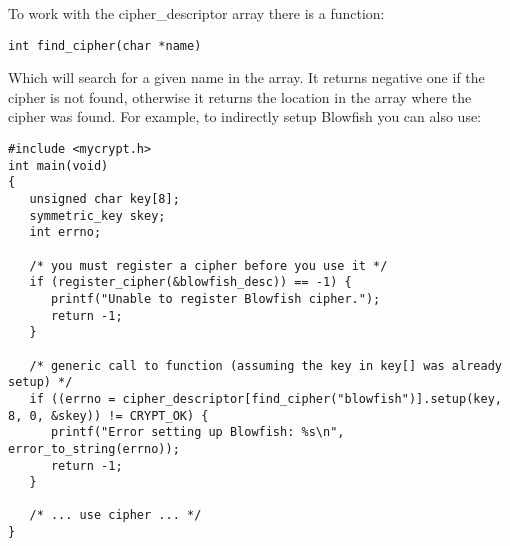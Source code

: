 \documentclass[b5paper]{book}
\begin{document}
To work with the cipher\_descriptor array there is a function:
\begin{verbatim}
int find_cipher(char *name)
\end{verbatim}
Which will search for a given name in the array.  It returns negative one if the cipher is not found, otherwise it returns
the location in the array where the cipher was found.  For example, to indirectly setup Blowfish you can also use:
\begin{small}
\begin{verbatim}
#include <mycrypt.h>
int main(void)
{
   unsigned char key[8];
   symmetric_key skey;
   int errno;

   /* you must register a cipher before you use it */
   if (register_cipher(&blowfish_desc)) == -1) {
      printf("Unable to register Blowfish cipher.");
      return -1;
   }

   /* generic call to function (assuming the key in key[] was already setup) */
   if ((errno = cipher_descriptor[find_cipher("blowfish")].setup(key, 8, 0, &skey)) != CRYPT_OK) {
      printf("Error setting up Blowfish: %s\n", error_to_string(errno));
      return -1;
   }

   /* ... use cipher ... */
}
\end{verbatim}
\end{small}
\end{document}
